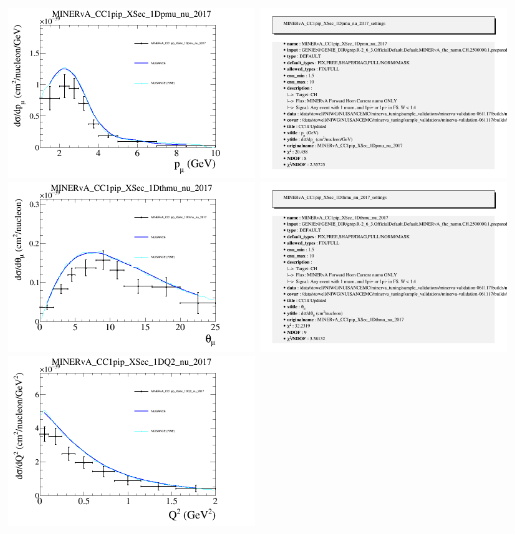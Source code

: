\documentclass{article}
\begin{document}
\centering
\includegraphics[width=0.49\textwidth]{figures/nuisance_MINERvA_CC1pip_XSec_1Dpmu_nu_2017_comp.png}
\includegraphics[width=0.49\textwidth]{figures/nuisance_MINERvA_CC1pip_XSec_1Dpmu_nu_2017_info.png}
\centering
\includegraphics[width=0.49\textwidth]{figures/nuisance_MINERvA_CC1pip_XSec_1Dthmu_nu_2017_comp.png}
\includegraphics[width=0.49\textwidth]{figures/nuisance_MINERvA_CC1pip_XSec_1Dthmu_nu_2017_info.png}
\centering
\includegraphics[width=0.49\textwidth]{figures/nuisance_MINERvA_CC1pip_XSec_1DQ2_nu_2017_comp.png}
\end{document}
